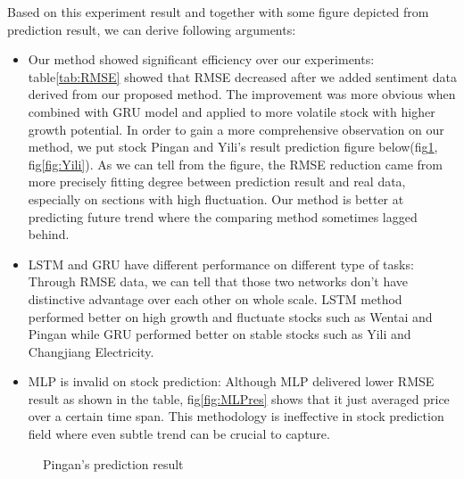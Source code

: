 \documentclass[runningheads]{llncs}
\begin{document}
Based on this experiment result and together with some figure depicted from prediction result, we can derive following arguments:
\begin{itemize}
    \item Our method showed significant efficiency over our experiments: table\ref{tab:RMSE} showed that RMSE decreased after we added sentiment data derived from our proposed method. The improvement was more obvious when combined with GRU model and applied to more volatile stock with higher growth potential. In order to gain a more comprehensive observation on our method, we put stock Pingan and Yili’s result prediction figure below(fig\ref{fig:Pingan}, fig\ref{fig:Yili}). As we can tell from the figure, the RMSE reduction came from more precisely fitting degree between prediction result and real data, especially on sections with high fluctuation. Our method is better at predicting future trend where the comparing method sometimes lagged behind.
    \item LSTM and GRU have different performance on different type of tasks: Through RMSE data, we can tell that those two networks don’t have distinctive advantage over each other on whole scale. LSTM method performed better on high growth and fluctuate stocks such as Wentai and Pingan while GRU performed better on stable stocks such as Yili and Changjiang Electricity. 
    \item MLP is invalid on stock prediction: Although MLP delivered lower RMSE result as shown in the table, fig\ref{fig:MLPres} shows that it just averaged price over a certain time span. This methodology is ineffective in stock prediction field where even subtle trend can be crucial to capture.
\end{itemize}
\begin{figure} 
  \centering 
  \caption{Pingan's prediction result} 
  \label{fig:Pingan} %
\end{figure}
\end{document}
